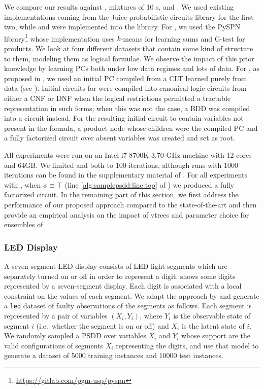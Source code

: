 We compare our results against , mixtures of 10 s,
 and . We used existing implementations coming from the
Juice probabilistic circuits library \citep{dang21} for the first two, while 
and  were implemented into the library. For , we used the
PySPN library\footnote{\url{https://gitlab.com/pgm-usp/pyspn}} whose implementation uses $k$-means
for learning sums and G-test for products. We look at four different datasets that contain some
kind of structure to them, modeling them as logical formulae. We observe the impact of this prior
knowledge by learning PCs both under low data regimes and lots of data. For , as
proposed in \citet{dang20}, we used an initial PC compiled from a CLT learned purely from data (see
). Initial circuits for  were compiled into canonical logic
circuits from either a CNF or DNF when the logical restrictions permitted a tractable
representation in such forms; when this was not the case, a BDD was compiled into a circuit
instead. For the resulting initial circuit to contain variables not present in the formula, a
product node whose children were the compiled PC and a fully factorized circuit over absent
variables was created and set as root.

All experiments were run on an Intel i7-8700K 3.70 GHz machine with 12 cores and 64GB. We limited
 and  both to 100 iterations, although runs with 1000
iterations can be found in the supplementary material of . For all
experiments with , when $\phi\equiv\top$ (line \ref{alg:samplepsdd:line:top}
of ) we produced a fully factorized circuit. In the remaining part of this
section, we first address the performance of our proposed approach compared to the state-of-the-art
and then provide an empirical analysis on the impact of vtrees and parameter choice for ensembles
of 

\subsubsection{LED Display}

A seven-segment LED display consists of LED light segments which are separately turned on or off in
order to represent a digit.  shows some digits represented by a seven-segment
display. Each digit is associated with a local constraint on the values of each segment. We adapt
the approach by \citet{mattei20a} and generate a \texttt{led} dataset of faulty observations of the
segments as follows. Each segment is represented by a pair of variables $(X_i,Y_i)$, where $Y_i$ is
the observable state of segment $i$ (i.e.\ whether the segment is on or off) and $X_i$ is the
latent state of $i$. We randomly sampled a PSDD over variables $X_i$ and $Y_i$ whose support are
the valid configurations of segments $X_i$ representing the digits, and use that model to generate
a dataset of \num{5000} training instances and \num{10000} test instances.

